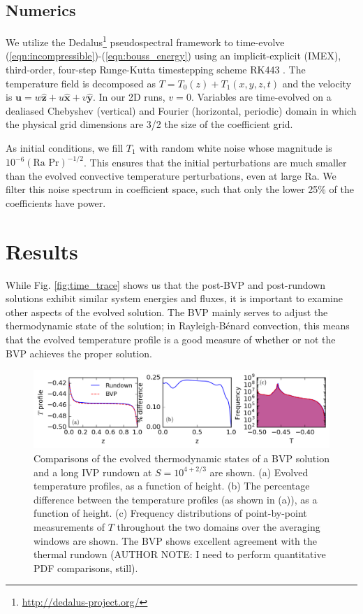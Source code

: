 \documentclass[aps, pre, onecolumn, nofootinbib, notitlepage, groupedaddress, amsfonts, amssymb, amsmath, longbibliography]{revtex4-1}
\newcommand{\RB}{Rayleigh-B\'{e}nard }
\begin{document}
\subsection{Numerics}
We utilize the 
Dedalus\footnote{\url{http://dedalus-project.org/}} 
pseudospectral framework \cite{burns&all2016} to time-evolve  
(\ref{eqn:incompressible})-(\ref{eqn:bouss_energy}) 
using an implicit-explicit (IMEX), third-order, four-step 
Runge-Kutta timestepping scheme RK443 \cite{ascher&all1997}.  
The temperature field is decomposed as $T = T_0(z) + T_1(x, y, z, t)$
and the velocity is $\bm{u} = w\bm{\hat{z}} + u\bm{\hat{x}} + v\bm{\hat{y}}$.
In our 2D runs, $v = 0$.
Variables are time-evolved on a dealiased Chebyshev (vertical)
and Fourier (horizontal, periodic) domain in which the
physical grid dimensions are 3/2 the size of the coefficient grid.  

As initial conditions, we fill $T_1$ with
random white noise whose magnitude is $10^{-6}(\text{Ra Pr})^{-1/2}$.
This ensures that the initial perturbations are much smaller than the
evolved convective temperature perturbations, even at large Ra.
We filter this noise spectrum in coefficient space, 
such that only the lower 25\% of the coefficients
have power.

\section{Results}
While Fig. \ref{fig:time_trace} shows us that the post-BVP and post-rundown solutions
exhibit similar system energies and fluxes, it is important to examine other aspects of
the evolved solution. The BVP mainly serves to adjust the thermodynamic state of the solution;
in \RB convection, this means that the evolved temperature profile is a good measure of whether
or not the BVP achieves the proper solution.

\begin{figure}[t]
\includegraphics[width=\textwidth]{./figs/temp_comparison.png}
\caption{Comparisons of the evolved thermodynamic states of a BVP solution and a long IVP rundown at
$S = 10^{4 + 2/3}$ are shown.  (a) Evolved temperature profiles, as a function of height.
(b) The percentage difference between the temperature profiles (as shown in (a)), as a function of height.
(c) Frequency distributions of point-by-point measurements of $T$ throughout the two domains over the
averaging windows are shown.
The BVP shows excellent agreement with the thermal rundown (AUTHOR NOTE: I need to perform quantitative PDF
comparisons, still).
\label{fig:temp_comparison} }
\end{figure}
\end{document}
